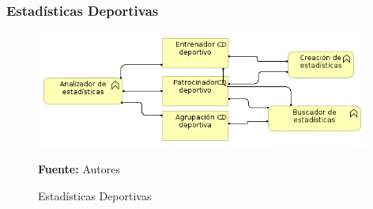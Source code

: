 \subsubsection{Estadísticas Deportivas}

\begin{figure}[!htb]
  \begin{center}
    \includegraphics[width=11cm]{./imagenes/business_functions/estadisticasdeportivas.png}
    \caption{Estadísticas Deportivas}
    \label{fig:estadisticas_deportivas}
    \textbf{Fuente:}  Autores
  \end{center}
\end{figure}

